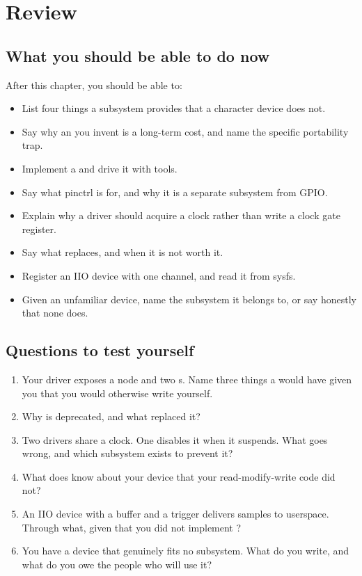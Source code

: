 
\section{Review}
\label{c11:sec:review}

\subsection*{What you should be able to do now}
After this chapter, you should be able to:
\begin{itemize}
  \item List four things a subsystem provides that a character device does not.
  \item Say why an  you invent is a long-term cost, and name the specific portability
    trap.
  \item Implement a  and drive it with  tools.
  \item Say what pinctrl is for, and why it is a separate subsystem from GPIO.
  \item Explain why a driver should acquire a clock rather than write a clock gate register.
  \item Say what  replaces, and when it is not worth it.
  \item Register an IIO device with one channel, and read it from sysfs.
  \item Given an unfamiliar device, name the subsystem it belongs to, or say honestly that none
    does.
\end{itemize}

\subsection*{Questions to test yourself}
\begin{enumerate}
  \item Your driver exposes a  node and two s. Name three things a
     would have given you that you would otherwise write yourself.
  \item Why is  deprecated, and what replaced it?
  \item Two drivers share a clock. One disables it when it suspends. What goes wrong, and which
    subsystem exists to prevent it?
  \item What does  know about your device that your read-modify-write code did not?
  \item An IIO device with a buffer and a trigger delivers samples to userspace. Through what, given
    that you did not implement ?
  \item You have a device that genuinely fits no subsystem. What do you write, and what do you owe
    the people who will use it?
\end{enumerate}

